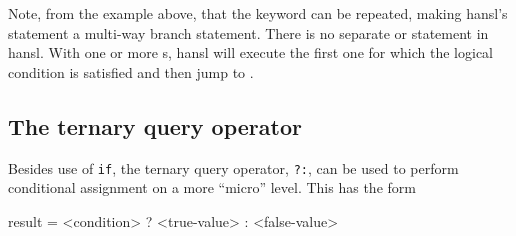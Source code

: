 Note, from the example above, that the  keyword can be
repeated, making hansl's  statement a multi-way branch
statement. There is no separate  or  statement
in hansl. With one or more s, hansl will execute the first
one for which the logical condition is satisfied and then jump to
.



\subsection{The ternary query operator}

Besides use of \texttt{if}, the ternary query operator, \texttt{?:},
can be used to perform conditional assignment on a more ``micro''
level. This has the form
\begin{code}
result = <condition> ? <true-value> : <false-value>
\end{code}

